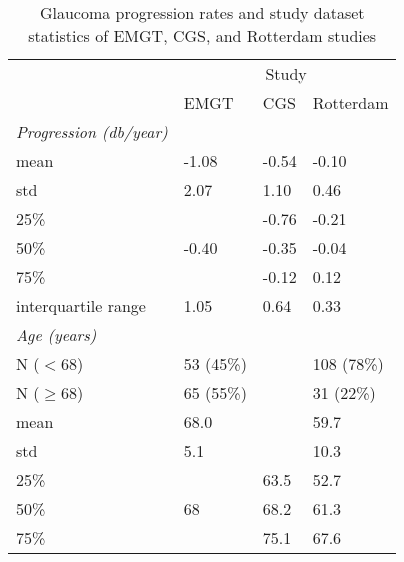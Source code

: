 \begin{table}[b!]
\centering
\caption{Glaucoma progression rates and study dataset statistics of \acs{EMGT}, \acs{CGS}, and Rotterdam studies}
\label{tab:glaucprogress}
\begin{tabular}{@{}llll@{}}
	\toprule
	                               &                      \multicolumn{3}{c}{Study}                       \\
	\cmidrule{2-4}                 & \acs{EMGT} \cite{Heijl2009} & \acs{CGS} \cite{Group2010} & Rotterdam \\ \midrule
	\textit{Progression (db/year)} &                             &                            &           \\
	mean                           & -1.08                       & -0.54                      & -0.10     \\
	std                            & 2.07                        & 1.10                       & 0.46      \\
	25\%                           &                             & -0.76                      & -0.21     \\
	50\%                           & -0.40                       & -0.35                      & -0.04     \\
	75\%                           &                             & -0.12                      & 0.12      \\
	interquartile range            & 1.05                        & 0.64                       & 0.33      \\ \midrule
	\textit{Age (years)}           &                             &                            &           \\
	N ($<68$)                      & 53 (45\%)                    &                            & 108 (78\%)          \\
	N ($\geq68$)                   & 65 (55\%)                    &                            & 31 (22\%)          \\
	mean                           & 68.0                        &                            & 59.7          \\
	std                            & 5.1                         &                            & 10.3         \\
	25\%                           &                             & 63.5                       & 52.7         \\
	50\%                           & 68                          & 68.2                       & 61.3          \\
	75\%                           &                             & 75.1                       & 67.6          \\ \bottomrule
\end{tabular}
\end{table}

